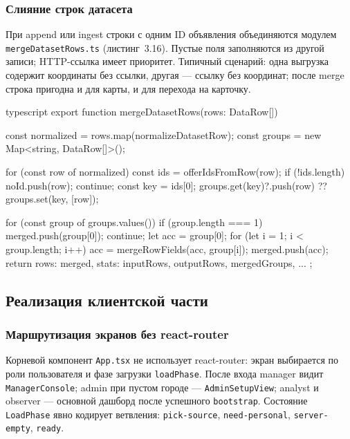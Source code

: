 \subsubsection{Слияние строк датасета}

При append или ingest строки с одним ID объявления объединяются модулем \texttt{mergeDatasetRows.ts} (листинг~3.16). Пустые поля заполняются из другой записи; HTTP-ссылка имеет приоритет. Типичный сценарий: одна выгрузка содержит координаты без ссылки, другая --- ссылку без координат; после merge строка пригодна и для карты, и для перехода на карточку.

\begin{singleminted}{typescript}
export function mergeDatasetRows(rows: DataRow[]) {
    const normalized = rows.map(normalizeDatasetRow);
    const groups = new Map<string, DataRow[]>();

    for (const row of normalized) {
        const ids = offerIdsFromRow(row);
        if (!ids.length) { noId.push(row); continue; }
        const key = ids[0];
        groups.get(key)?.push(row) ?? groups.set(key, [row]);
    }

    for (const group of groups.values()) {
        if (group.length === 1) { merged.push(group[0]); continue; }
        let acc = group[0];
        for (let i = 1; i < group.length; i++) {
            acc = mergeRowFields(acc, group[i]);
        }
        merged.push(acc);
    }
    return { rows: merged, stats: { inputRows, outputRows, mergedGroups, ... } };
}
\end{singleminted}
\label{lst:merge-rows}

\subsection{Реализация клиентской части}

\subsubsection{Маршрутизация экранов без react-router}

Корневой компонент \texttt{App.tsx} не использует react-router: экран выбирается по роли пользователя и фазе загрузки \texttt{loadPhase}. После входа manager видит \texttt{ManagerConsole}; admin при пустом городе --- \texttt{AdminSetupView}; analyst и observer --- основной дашборд после успешного \texttt{bootstrap}. Состояние \texttt{LoadPhase} явно кодирует ветвления: \texttt{pick-source}, \texttt{need-personal}, \texttt{server-empty}, \texttt{ready}.

